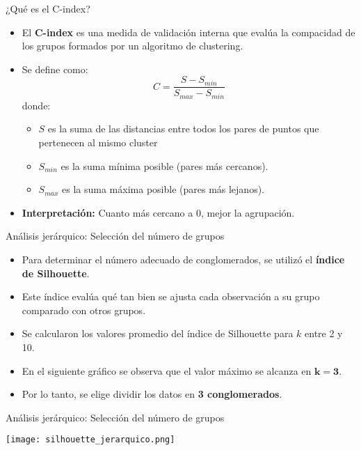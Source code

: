 \documentclass[
	11pt, %
]{beamer}
\begin{document}
\begin{frame}{¿Qué es el C-index?}
    \begin{itemize}
        \item El \textbf{C-index} es una medida de validación interna que evalúa la compacidad de los grupos formados por un algoritmo de clustering.
        \item Se define como:
        \[
            C = \frac{S - S_{min}}{S_{max} - S_{min}}
        \]
        donde:
        \begin{itemize}
            \item $S$ es la suma de las distancias entre todos los pares de puntos que pertenecen al mismo cluster
            \item $S_{min}$ es la suma mínima posible (pares más cercanos).
            \item $S_{max}$ es la suma máxima posible (pares más lejanos).
        \end{itemize}
        \item \textbf{Interpretación:} Cuanto más cercano a 0, mejor la agrupación.
    \end{itemize}
\end{frame}


\begin{frame}{Análisis jerárquico: Selección del número de grupos}
\begin{itemize}
    \item Para determinar el número adecuado de conglomerados, se utilizó el \textbf{índice de Silhouette}.
    \item Este índice evalúa qué tan bien se ajusta cada observación a su grupo comparado con otros grupos.
    \item Se calcularon los valores promedio del índice de Silhouette para $k$ entre 2 y 10.
    \item En el siguiente gráfico se observa que el valor máximo se alcanza en $\mathbf{k = 3}$.
    \item Por lo tanto, se elige dividir los datos en \textbf{3 conglomerados}.
\end{itemize}
\end{frame}

\begin{frame}{Análisis jerárquico: Selección del número de grupos}
\begin{center}
    \texttt{[image: silhouette\_jerarquico.png]}
\end{center}
\end{frame}
\end{document}
